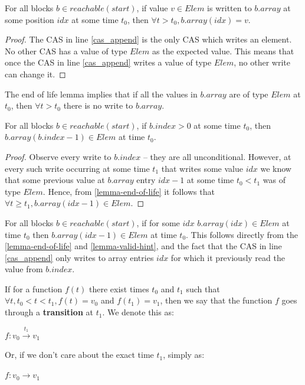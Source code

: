 \documentclass[runningheads,a4paper]{llncs}
\begin{document}
\begin{lemma}\label{lemma-end-of-life}
For all blocks $b \in reachable(start)$, if value $v \in Elem$ is
written to $b.array$ at some position $idx$ at some time $t_0$, then
$\forall t > t_0, b.array(idx) = v$.
\end{lemma}

\begin{proof}
The CAS in line \ref{cas_append} is the only CAS which writes an
element.
No other CAS has a value of type $Elem$ as the expected value.
This means that once the CAS in line \ref{cas_append} writes a value
of type $Elem$, no other write can change it.
\end{proof}


\begin{corollary}\label{cor-end-of-life}
The end of life lemma implies that if all the values in $b.array$ are
of type $Elem$ at $t_0$, then $\forall t > t_0$ there is no write to $b.array$.
\end{corollary}


\begin{lemma}\label{lemma-valid-hint}
For all blocks $b \in reachable(start)$, if $b.index > 0$ at some time $t_0$, then
$b.array(b.index - 1) \in Elem$ at time $t_0$.
\end{lemma}

\begin{proof}
Observe every write to $b.index$ -- they are all unconditional.
However, at every such write occurring at some time $t_1$ that writes
some value $idx$ we know that some previous value at $b.array$ entry $idx - 1$
at some time $t_0 < t_1$ was of type $Elem$.
Hence, from \ref{lemma-end-of-life} it follows that
$\forall t \geq t_1, b.array(idx - 1) \in Elem$.
\end{proof}


\begin{corollary}[Compactness]\label{cor-compactness}
For all blocks $b \in reachable(start)$, if for some $idx$
$b.array(idx) \in Elem$ at time $t_0$ then $b.array(idx - 1) \in Elem$
at time $t_0$. This follows
directly from the \ref{lemma-end-of-life} and
\ref{lemma-valid-hint}, and the fact that the CAS in line
\ref{cas_append} only writes to array entries $idx$ for which it
previously read the value from $b.index$.
\end{corollary}


\begin{definition}[Transition]
If for a function $f(t)$ there exist times $t_0$ and $t_1$ such that
$\forall t, t_0 < t < t_1, f(t) = v_0$ and $f(t_1) = v_1$, then we say
that the function $f$ goes through a \textbf{transition} at $t_1$. We denote this as:

$f: v_0 \stackrel{t_1}{\rightarrow} v_1$

Or, if we don't care about the exact time $t_1$, simply as:

$f: v_0 \rightarrow v_1$
\end{definition}
\end{document}
